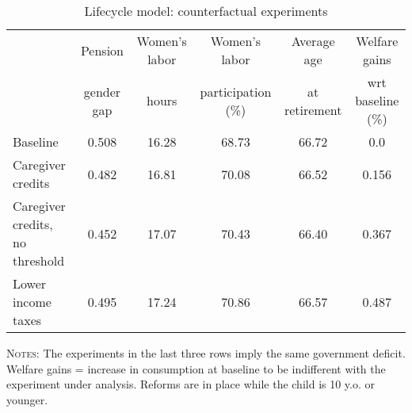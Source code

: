 \begin{table}[htbp]\begin{threeparttable}\caption{Lifecycle model: counterfactual experiments}\label{table:experiments}\centering\footnotesize\begin{tabular}{lccccc} \toprule & Pension & Women's labor & Women's labor & Average age &  Welfare gains  \\&gender gap &hours &  participation  (\%) & at retirement  & wrt baseline (\%)  \\\midrule    Baseline                                   &0.508&16.28&68.73&66.72& 0.0\\ Caregiver credits                          &0.482&16.81&70.08&66.52&0.156\\ Caregiver credits, no threshold            &0.452&17.07&70.43&66.40&0.367\\ Lower income taxes                         &0.495&17.24&70.86&66.57&0.487\\ \bottomrule\end{tabular}\begin{tablenotes}[flushleft]\small\item \textsc{Notes:} The experiments in the last three rows imply the same government deficit. Welfare gains = increase in consumption at baseline to be indifferent with the experiment under analysis. Reforms are in place while the child is 10 y.o. or younger.\\\end{tablenotes}\end{threeparttable}\end{table}